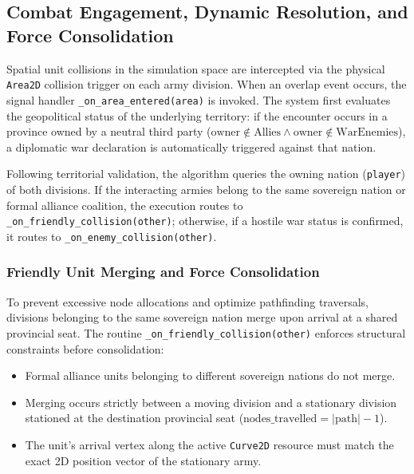 \subsection{Combat Engagement, Dynamic Resolution, and Force Consolidation}
\label{subsec:combat_system}

Spatial unit collisions in the simulation space are intercepted via the physical \texttt{Area2D} collision trigger on each army division. When an overlap event occurs, the signal handler \texttt{\_on\_area\_entered(area)} is invoked. The system first evaluates the geopolitical status of the underlying territory: if the encounter occurs in a province owned by a neutral third party ($\text{owner} \notin \text{Allies} \land \text{owner} \notin \text{WarEnemies}$), a diplomatic war declaration is automatically triggered against that nation.

Following territorial validation, the algorithm queries the owning nation (\texttt{player}) of both divisions. If the interacting armies belong to the same sovereign nation or formal alliance coalition, the execution routes to \texttt{\_on\_friendly\_collision(other)}; otherwise, if a hostile war status is confirmed, it routes to \texttt{\_on\_enemy\_collision(other)}.

\subsubsection{Friendly Unit Merging and Force Consolidation}
To prevent excessive node allocations and optimize pathfinding traversals, divisions belonging to the same sovereign nation merge upon arrival at a shared provincial seat. The routine \texttt{\_on\_friendly\_collision(other)} enforces structural constraints before consolidation:

\begin{itemize}
    \item Formal alliance units belonging to different sovereign nations do not merge.
    \item Merging occurs strictly between a moving division and a stationary division stationed at the destination provincial seat ($\text{nodes\_travelled} = |\text{path}| - 1$).
    \item The unit's arrival vertex along the active \texttt{Curve2D} resource must match the exact 2D position vector of the stationary army.
\end{itemize}

